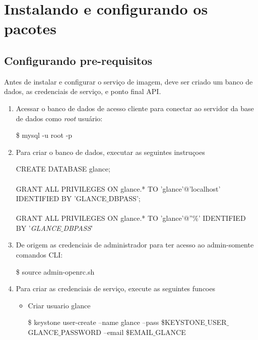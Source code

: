 \section{Instalando e configurando os pacotes}

	\subsection{Configurando pre-requisitos}
	
Antes de instalar e configurar o serviço de imagem, deve ser criado um banco de dados, as credenciais de serviço, e ponto final API.

	\begin{enumerate}
		\item Acessar o banco de dados de acesso cliente para conectar ao servidor da base de dados como \emph{root} usuário:
		\begin{snugshade}
			\$ mysql -u root -p
		\end{snugshade}
	
		\item Para criar o banco de dados, executar as seguintes instruçoes
		\begin{snugshade}
			CREATE DATABASE glance; \\ \\
			GRANT ALL PRIVILEGES ON glance.* TO 'glance'@'localhost' IDENTIFIED BY 'GLANCE$\_$DBPASS'; \\ \\
			GRANT ALL PRIVILEGES ON glance.* TO 'glance'@''\%' IDENTIFIED BY '\emph{GLANCE$\_$DBPASS}'
			\end{snugshade}
			
		\item De origem as credenciais de administrador para ter acesso ao admin-somente comandos CLI:
		\begin{snugshade}	
			\$ source admin-openrc.sh
		\end{snugshade}	
		
		\item Para criar as credenciais de serviço, execute as seguintes funcoes
		
		\begin{itemize}
			\item Criar usuario glance
				\begin{snugshade}	
					\$ 	keystone user-create --name glance --pass \$KEYSTONE$\_$USER$\_$GLANCE$\_$PASSWORD --email \$EMAIL$\_$GLANCE
				\end{snugshade}	
	

\end{itemize}
\end{enumerate}
